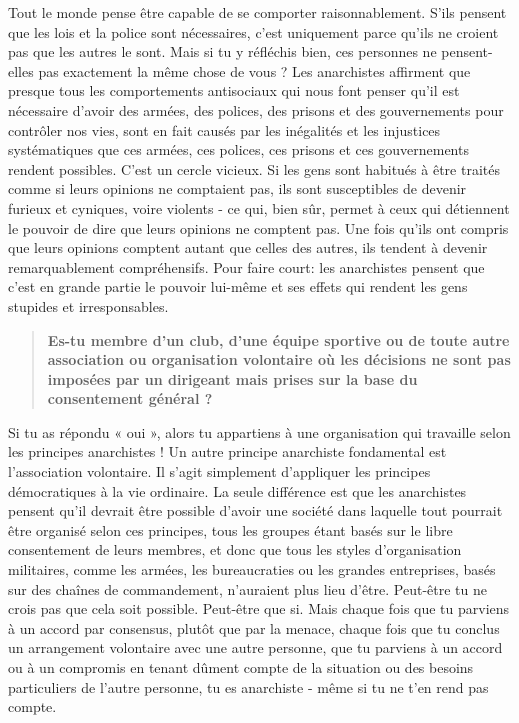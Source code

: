 Tout le monde pense être capable de se comporter raisonnablement. S'ils pensent que les lois et la police sont nécessaires, c'est uniquement parce qu'ils ne croient pas que les autres le sont. Mais si tu y réfléchis bien, ces personnes ne pensent-elles pas exactement la même chose de vous ? Les anarchistes affirment que presque tous les comportements antisociaux qui nous font penser qu'il est nécessaire d'avoir des armées, des polices, des prisons et des gouvernements pour contrôler nos vies, sont en fait causés par les inégalités et les injustices systématiques que ces armées, ces polices, ces prisons et ces gouvernements rendent possibles. C'est un cercle vicieux. Si les gens sont habitués à être traités comme si leurs opinions ne comptaient pas, ils sont susceptibles de devenir furieux et cyniques, voire violents - ce qui, bien sûr, permet à ceux qui détiennent le pouvoir de dire que leurs opinions ne comptent pas. Une fois qu'ils ont compris que leurs opinions comptent autant que celles des autres, ils tendent à devenir remarquablement compréhensifs. Pour faire court: les anarchistes pensent que c'est en grande partie le pouvoir lui-même et ses effets qui rendent les gens stupides et irresponsables.

\begin{quotation}
\textbf{Es-tu membre d'un club, d'une équipe sportive ou de toute autre association ou organisation volontaire où les décisions ne sont pas imposées par un dirigeant mais prises sur la base du consentement général ?}
\end{quotation}

Si tu as répondu « oui », alors tu appartiens à une organisation qui travaille selon les principes anarchistes ! Un autre principe anarchiste fondamental est l'association volontaire. Il s'agit simplement d'appliquer les principes démocratiques à la vie ordinaire. La seule différence est que les anarchistes pensent qu'il devrait être possible d'avoir une société dans laquelle tout pourrait être organisé selon ces principes, tous les groupes étant basés sur le libre consentement de leurs membres, et donc que tous les styles d'organisation militaires, comme les armées, les bureaucraties ou les grandes entreprises, basés sur des chaînes de commandement, n'auraient plus lieu d'être. Peut-être tu ne crois pas que cela soit possible. Peut-être que si. Mais chaque fois que tu parviens à un accord par consensus, plutôt que par la menace, chaque fois que tu conclus un arrangement volontaire avec une autre personne, que tu parviens à un accord ou à un compromis en tenant dûment compte de la situation ou des besoins particuliers de l'autre personne, tu es anarchiste - même si tu ne t’en rend pas compte.

